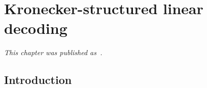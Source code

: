 \chapter{Kronecker-structured linear decoding}
\label{sec:stbf-struct}
\newcommand{\pv}[1]{
	#1
}

  \emph{This chapter was
  published as~\textcite{VanDenKerchove2022}.}

	\section{Introduction}



